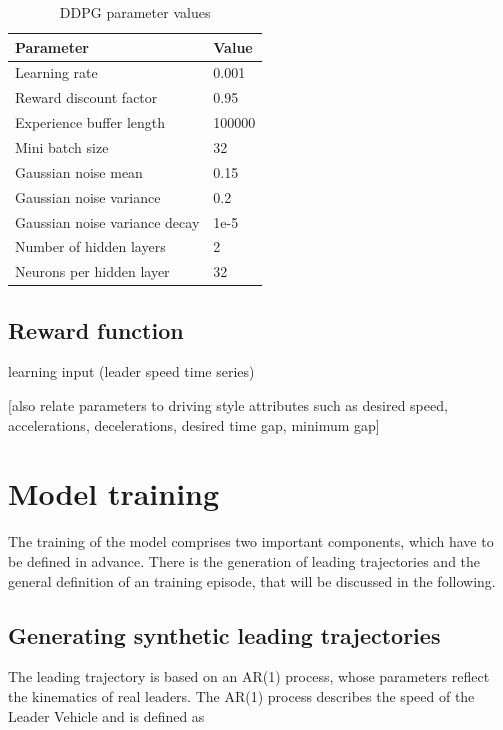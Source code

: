 \documentclass[review]{elsarticle}
\begin{document}
\begin{table}
	\caption{DDPG parameter values} 
	\label{tab:DDPGparameters} 
	\begin{center}
		\begin{tabular}{ p{} p{} }
			Parameter & Value \\ \hline
			Learning rate & 0.001 \\ 
			Reward discount factor & 0.95 \\ 
			Experience buffer length & 100000 \\ 
			Mini batch size & 32 \\ 			
			Gaussian noise mean & 0.15 \\ 
			Gaussian noise variance & 0.2 \\ 
			Gaussian noise variance decay  & 1e-5 \\ 
			Number of hidden layers & 2\\
			Neurons per hidden layer & 32\\
			

		\end{tabular}
	\end{center}
\end{table}


\subsection{Reward function}

learning input (leader speed time series)

[also relate parameters to driving style attributes such as desired
speed, accelerations, decelerations, desired time gap, minimum gap]


\section{Model training}
The training of the model comprises two important components, which have to be defined in advance. There is the generation of leading trajectories and the general definition of an training episode, that will be discussed in the following.

\subsection{Generating synthetic leading trajectories}
The leading trajectory is based on an AR(1) process, whose parameters reflect the kinematics of real leaders. The AR(1) process describes the speed of the Leader Vehicle and is defined as 
\end{document}

